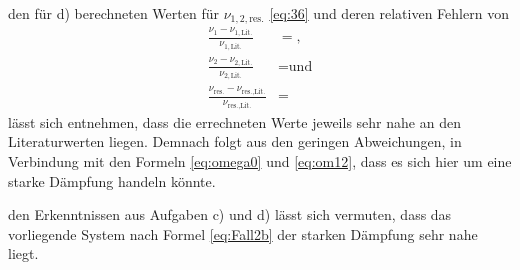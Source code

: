 \justifying den für d) berechneten Werten für $\nu_{1,2,\text{res.}}$ \eqref{eq:36} und deren relativen Fehlern von
  \begin{subequations}\label{eq:37}
  \begin{align}
    \frac{\nu_1 - \nu_{1,\text{Lit.}}}{\nu_{1,\text{Lit.}}} &= \text{}, \\
    \frac{\nu_2 - \nu_{2,\text{Lit.}}}{\nu_{2,\text{Lit.}}} &= \text{} \text{und} \\
    \frac{\nu_{\text{res.}} - \nu_{\text{res.,Lit.}}}{\nu_{\text{res.,Lit.}}} &= \text{}
  \end{align} 
  \end{subequations}
lässt sich entnehmen, dass die errechneten Werte jeweils sehr nahe an den Literaturwerten liegen. Demnach folgt aus den geringen Abweichungen, in 
Verbindung mit den Formeln \eqref{eq:omega0} und \eqref{eq:om12}, dass es sich hier um eine starke Dämpfung handeln könnte.

\justifying den Erkenntnissen aus Aufgaben c) und d) lässt sich vermuten, dass das vorliegende System nach Formel 
\eqref{eq:Fall2b} der starken Dämpfung sehr nahe liegt.  

\newpage

\printbibliography





